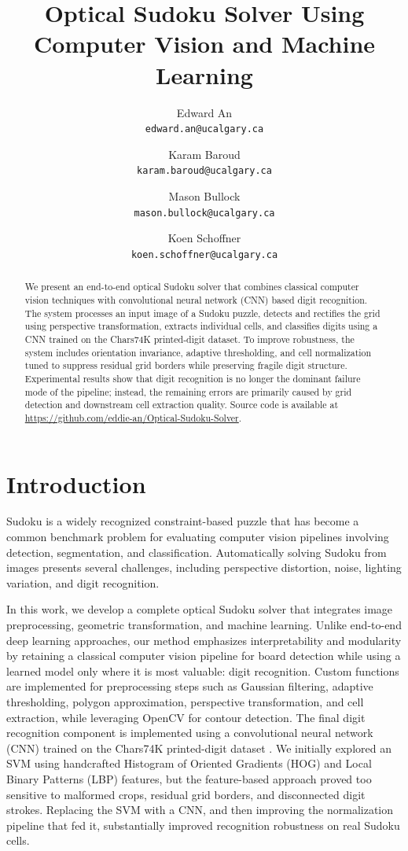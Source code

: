 \documentclass[10pt,twocolumn,letterpaper]{article}
\title{Optical Sudoku Solver Using Computer Vision and Machine Learning}
\author{
Edward An\\
{\tt\small edward.an@ucalgary.ca}
\and
Karam Baroud\\
{\tt\small karam.baroud@ucalgary.ca}
\and
Mason Bullock\\
{\tt\small mason.bullock@ucalgary.ca}
\and
Koen Schoffner\\
{\tt\small koen.schoffner@ucalgary.ca}
}
\begin{document}
\maketitle

\begin{abstract}
We present an end-to-end optical Sudoku solver that combines classical computer vision techniques with convolutional neural network (CNN) based digit recognition. The system processes an input image of a Sudoku puzzle, detects and rectifies the grid using perspective transformation, extracts individual cells, and classifies digits using a CNN trained on the Chars74K printed-digit dataset. To improve robustness, the system includes orientation invariance, adaptive thresholding, and cell normalization tuned to suppress residual grid borders while preserving fragile digit structure. Experimental results show that digit recognition is no longer the dominant failure mode of the pipeline; instead, the remaining errors are primarily caused by grid detection and downstream cell extraction quality.
Source code is available at \url{https://github.com/eddie-an/Optical-Sudoku-Solver}.
\end{abstract}

\section{Introduction}
Sudoku is a widely recognized constraint-based puzzle that has become a common benchmark problem for evaluating computer vision pipelines involving detection, segmentation, and classification. Automatically solving Sudoku from images presents several challenges, including perspective distortion, noise, lighting variation, and digit recognition.

In this work, we develop a complete optical Sudoku solver that integrates image preprocessing, geometric transformation, and machine learning. Unlike end-to-end deep learning approaches, our method emphasizes interpretability and modularity by retaining a classical computer vision pipeline for board detection while using a learned model only where it is most valuable: digit recognition.
Custom functions are implemented for preprocessing steps such as Gaussian filtering, adaptive thresholding, polygon approximation, perspective transformation, and cell extraction, while leveraging OpenCV \cite{bradski2000opencv} for contour detection. The final digit recognition component is implemented using a convolutional neural network (CNN) trained on the Chars74K printed-digit dataset \cite{deCampos09}. We initially explored an SVM using handcrafted Histogram of Oriented Gradients (HOG) \cite{dalal2005histograms} and Local Binary Patterns (LBP) \cite{ojala2002multiresolution} features, but the feature-based approach proved too sensitive to malformed crops, residual grid borders, and disconnected digit strokes. Replacing the SVM with a CNN, and then improving the normalization pipeline that fed it, substantially improved recognition robustness on real Sudoku cells.
\end{document}
